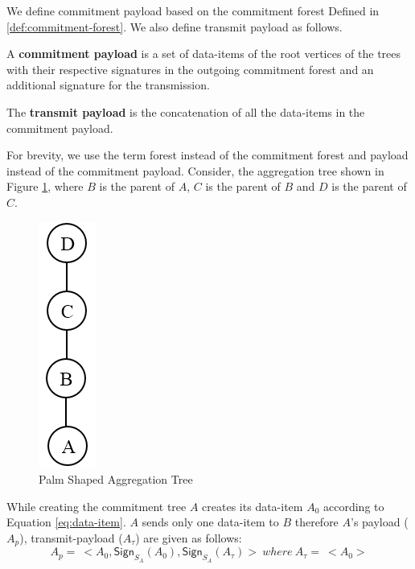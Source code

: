 	We define commitment payload based on the commitment forest Defined in \ref{def:commitment-forest}.
	We also define transmit payload as follows.
	\begin{definition}
		A \textbf{commitment payload} is a set of data-items of the root vertices of the trees with their respective signatures in the outgoing commitment forest and an additional signature for the transmission.
	\end{definition}
	\begin{definition}
		The \textbf{transmit payload} is the concatenation of all the data-items in the commitment payload.
	\end{definition}
	For brevity, we use the term forest instead of the commitment forest and payload instead of the commitment payload.
	Consider, the aggregation tree shown in Figure \ref{fig:Palm aggregation tree}, where $B$ is the parent of $A$, $C$ is the parent of $B$ and $D$ is the parent of $C$. 
	\begin{figure}[h!]
		\centering
		\includegraphics[scale = 1]{images/palm-aggregation-tree.png}
		\caption{Palm Shaped Aggregation Tree}
		\label{fig:Palm aggregation tree}
	\end{figure}
	While creating the commitment tree $A$ creates its data-item $A_{0}$ according to Equation \ref{eq:data-item}.
	$A$ sends only one data-item to $B$ therefore $A$'s payload ($A_{p}$), transmit-payload ($A_{\tau}$) are given as follows:
	\begin{equation}
		\label{eq:signing-payload}
			A_{p} =\ <A_{0}, \textsf{Sign}_{S_{A}}(A_{0}), \textsf{Sign}_{S_{A}}(A_{\tau}) >\ where\ A_{\tau} =\ < A_{0} > 
	\end{equation}

